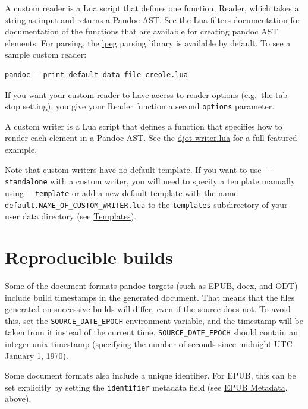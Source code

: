 \documentclass[
  b5paper
]{book}
\begin{document}
A custom reader is a Lua script that defines one function, Reader, which
takes a string as input and returns a Pandoc AST. See the
\href{https://pandoc.org/lua-filters.html}{Lua filters documentation}
for documentation of the functions that are available for creating
pandoc AST elements. For parsing, the
\href{http://www.inf.puc-rio.br/~roberto/lpeg/}{lpeg} parsing library is
available by default. To see a sample custom reader:

\begin{verbatim}
pandoc --print-default-data-file creole.lua
\end{verbatim}

If you want your custom reader to have access to reader options
(e.g.~the tab stop setting), you give your Reader function a second
\texttt{options} parameter.

A custom writer is a Lua script that defines a function that specifies
how to render each element in a Pandoc AST. See the
\href{https://github.com/jgm/djot.lua/blob/main/djot-writer.lua}{djot-writer.lua}
for a full-featured example.

Note that custom writers have no default template. If you want to use
\texttt{-\/-standalone} with a custom writer, you will need to specify a
template manually using \texttt{-\/-template} or add a new default
template with the name \texttt{default.NAME\_OF\_CUSTOM\_WRITER.lua} to
the \texttt{templates} subdirectory of your user data directory (see
\hyperref[templates]{Templates}).

\chapter{Reproducible builds}\label{reproducible-builds}

Some of the document formats pandoc targets (such as EPUB, docx, and
ODT) include build timestamps in the generated document. That means that
the files generated on successive builds will differ, even if the source
does not. To avoid this, set the \texttt{SOURCE\_DATE\_EPOCH}
environment variable, and the timestamp will be taken from it instead of
the current time. \texttt{SOURCE\_DATE\_EPOCH} should contain an integer
unix timestamp (specifying the number of seconds since midnight UTC
January 1, 1970).

Some document formats also include a unique identifier. For EPUB, this
can be set explicitly by setting the \texttt{identifier} metadata field
(see \hyperref[epub-metadata]{EPUB Metadata}, above).
\end{document}
